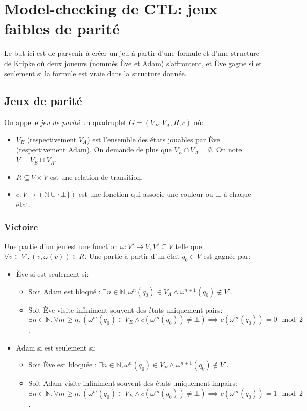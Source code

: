 \documentclass[10pt,a4paper]{article}
\begin{document}
\section{Model-checking de CTL: jeux faibles de parité}
Le but ici est de parvenir à créer un jeu à partir d'une formule et d'une structure de Kripke où deux joueurs (nommés Ève et Adam) s'affrontent, et Ève gagne si et seulement si la formule est vraie dans la structure donnée.

\subsection{Jeux de parité}
On appelle \emph{jeu de parité} un quadruplet $G = (V_E, V_A, R, c)$ où:
\begin{itemize}
\item $V_E$ (respectivement $V_A$) est l'ensemble des états jouables par Ève (respectivement Adam). On demande de plus que $V_E \cap V_A = \emptyset$. On note $V = V_E \sqcup V_A$.
\item $R \subseteq V \times V$ est une relation de transition.
\item $c : V \to (\mathbb{N} \cup \{\bot\})$ est une fonction qui associe une couleur ou $\bot$ à chaque état.
\end{itemize}

\subsubsection{Victoire}
Une partie d'un jeu est une fonction $\omega : V' \to V, V' \subseteq V$ telle que $\forall v \in V', (v,\omega(v)) \in R$.
Une partie à partir d'un état $q_0 \in V$ est gagnée par:
\begin{itemize}
\item Ève si est seulement si:
	\begin{itemize}
	\item Soit Adam est bloqué : $\exists n \in \mathbb{N}, \omega^n (q_0) \in V_A \land \omega^{n+1} (q_0) \notin V'$.
	\item Soit Ève visite infiniment souvent des états uniquement pairs: $\exists n \in \mathbb{N}, \forall m \geq n, (\omega^m(q_0) \in V_E \land c(\omega^m(q_0)) \neq \bot )\implies c(\omega^m(q_0)) = 0 \mod 2$.
	\end{itemize}
\item Adam si est seulement si:
\begin{itemize}
	\item Soit Ève est bloquée : $\exists n \in \mathbb{N}, \omega^n (q_0) \in V_E \land \omega^{n+1} (q_0) \notin V'$.
	\item Soit Adam visite infiniment souvent des états uniquement impairs: $\exists n \in \mathbb{N}, \forall m \geq n, (\omega^m(q_0) \in V_E \land c(\omega^m(q_0)) \neq \bot )\implies c(\omega^m(q_0)) = 1 \mod 2$.
\end{itemize}
\end{itemize}
\end{document}
